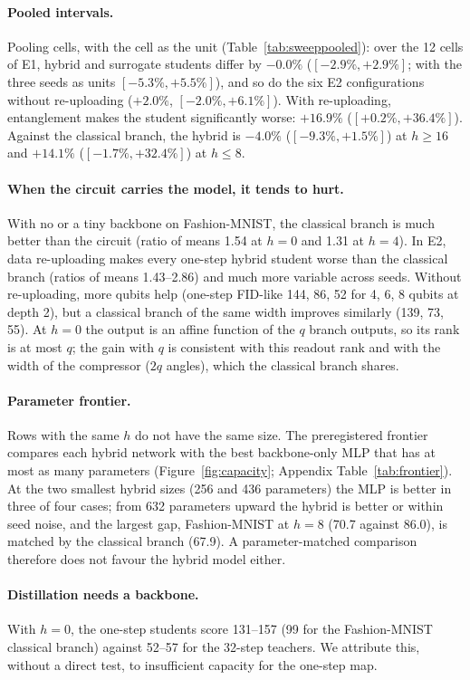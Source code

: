 \documentclass[11pt]{article}
\newcommand{\fidlike}{FID-like}
\begin{document}
\paragraph{Pooled intervals.} Pooling cells, with the cell as the unit
(Table~\ref{tab:sweeppooled}): over the 12 cells of E1, hybrid and surrogate
students differ by $-0.0\%$ ($[-2.9\%,+2.9\%]$; with the three seeds as units
$[-5.3\%,+5.5\%]$), and so do the six E2 configurations without re-uploading
($+2.0\%$, $[-2.0\%,+6.1\%]$). With re-uploading, entanglement makes the student
significantly worse: $+16.9\%$ ($[+0.2\%,+36.4\%]$). Against the classical branch,
the hybrid is $-4.0\%$ ($[-9.3\%,+1.5\%]$) at $h\ge16$ and $+14.1\%$
($[-1.7\%,+32.4\%]$) at $h\le8$.

\paragraph{When the circuit carries the model, it tends to hurt.} With no or a
tiny backbone on Fashion-MNIST, the classical branch is much better than the
circuit (ratio of means 1.54 at $h=0$ and 1.31 at $h=4$). In E2, data re-uploading
makes every one-step hybrid student worse than the classical branch (ratios of
means 1.43--2.86) and much more variable across seeds. Without re-uploading, more
qubits help (one-step \fidlike{} 144, 86, 52 for 4, 6, 8 qubits at depth 2), but a
classical branch of the same width improves similarly (139, 73, 55). At $h=0$ the
output is an affine function of the $q$ branch outputs, so its rank is at most $q$;
the gain with $q$ is consistent with this readout rank and with the width of the
compressor ($2q$ angles), which the classical branch shares.

\paragraph{Parameter frontier.} Rows with the same $h$ do not have the same size.
The preregistered frontier compares each hybrid network with the best
backbone-only MLP that has at most as many parameters (Figure~\ref{fig:capacity};
Appendix Table~\ref{tab:frontier}). At the two smallest hybrid sizes (256 and 436
parameters) the MLP is better in three of four cases; from 632 parameters upward the
hybrid is better or within seed noise, and the largest gap, Fashion-MNIST at $h=8$
(70.7 against 86.0), is matched by the classical branch (67.9). A
parameter-matched comparison therefore does not favour the hybrid model either.

\paragraph{Distillation needs a backbone.} With $h=0$, the one-step students score
131--157 (99 for the Fashion-MNIST classical branch) against 52--57 for the
32-step teachers. We attribute this, without a direct test, to insufficient
capacity for the one-step map.
\end{document}
